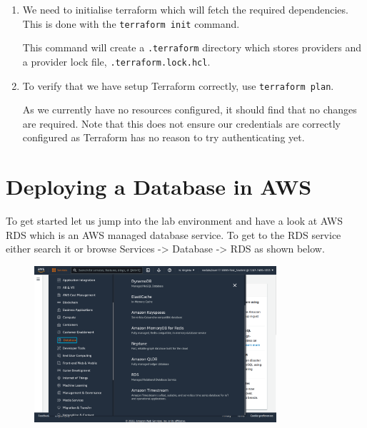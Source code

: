 \documentclass{csse4400}
\begin{document}
\begin{enumerate}
\item We need to initialise terraform which will fetch the required dependencies.
    This is done with the \texttt{terraform init} command.

This command will create a \texttt{.terraform} directory which stores providers and a provider lock file, \texttt{.terraform.lock.hcl}.

\item To verify that we have setup Terraform correctly, use \texttt{terraform plan}.

As we currently have no resources configured, it should find that no changes are required.
Note that this does not ensure our credentials are correctly configured as Terraform has no reason to try authenticating yet.

\end{enumerate}

\section{Deploying a Database in AWS}



To get started let us jump into the lab environment and have a look at AWS RDS which is an AWS managed database service. To get to the RDS service either search it or browse Services -> Database -> RDS as shown below.

\begin{figure}[H]
\includegraphics[width=0.8\textwidth]{images/aws_1}
\end{figure}
\end{document}
